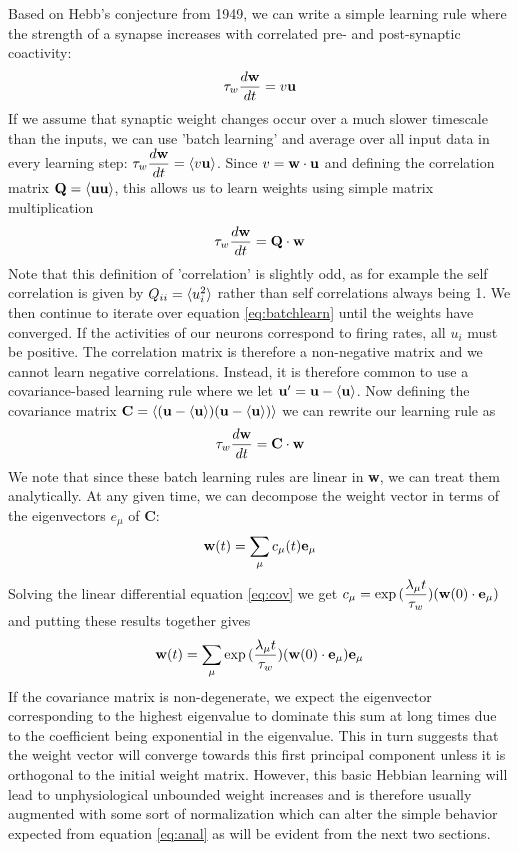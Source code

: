 \documentclass{article}
\begin{document}
Based on Hebb's conjecture from 1949, we can write a simple learning rule where the strength of a synapse increases with correlated pre- and post-synaptic coactivity:
\begin{equation}
\tau_w \dfrac{d\bf{w}}{dt} = v \bf{u}
\end{equation}
If we assume that synaptic weight changes occur over a much slower timescale than the inputs, we can use 'batch learning' and average over all input data in every learning step:
$
\tau_w \dfrac{d\bf{w}}{dt} = \braket{v \bf{u}}
$.
Since $v = \bf{w} \cdot \bf{u} $ and defining the correlation matrix ${\bf Q} = \braket{{\bf u u} }$, this allows us to learn weights using simple matrix multiplication
\begin{equation}\label{eq:batchlearn}
\tau_w \dfrac{d\bf{w}}{dt} = \bf Q \cdot w
\end{equation}
Note that this definition of 'correlation' is slightly odd, as for example the self correlation is given by $Q_{ii} = \braket{u_i^2}$ rather than self correlations always being 1.
We then continue to iterate over equation \ref{eq:batchlearn} until the weights have converged. If the activities of our neurons correspond to firing rates, all $u_i$ must be positive. The correlation matrix is therefore a non-negative matrix and we cannot learn negative correlations. Instead, it is therefore common to use a covariance-based learning rule where we let $\bf u' = u-\braket{u}$. Now defining the covariance matrix ${\bf C} = \braket{( {\bf u} - \braket{\bf u})  ( {\bf u} - \braket{\bf u})}$ we can rewrite our learning rule as
\begin{equation}\label{eq:cov}
\tau_w \dfrac{d\bf{w}}{dt} = \bf C \cdot w
\end{equation}
We note that since these batch learning rules are linear in \textbf{w}, we can treat them analytically.
At any given time, we can decompose the weight vector in terms of the eigenvectors $e_\mu$ of \textbf{C}:
\begin{equation}
{\bf w}(t) = \sum_\mu{ c_\mu(t) {\bf e}_\mu }
\end{equation}
Solving the linear differential equation \ref{eq:cov} we get
$
c_\mu = \exp{( \dfrac{\lambda_\mu t}{\tau_w})}({\bf w}(0) \cdot {\bf e_\mu})
$
and putting these results together gives
\begin{equation}\label{eq:anal}
{\bf w}(t) = \sum_\mu{ \exp{( \dfrac{\lambda_\mu t}{\tau_w})}({\bf w}(0) \cdot {\bf e_\mu})  {\bf e}_\mu}
\end{equation}
If the covariance matrix is non-degenerate, we expect the eigenvector corresponding to the highest eigenvalue to dominate this sum at long times due to the coefficient being exponential in the eigenvalue. This in turn suggests that the weight vector will converge towards this first principal component unless it is orthogonal to the initial weight matrix.
However, this basic Hebbian learning will lead to unphysiological unbounded weight increases and is therefore usually augmented with some sort of normalization which can alter the simple behavior expected from equation \ref{eq:anal} as will be evident from the next two sections.
\end{document}
